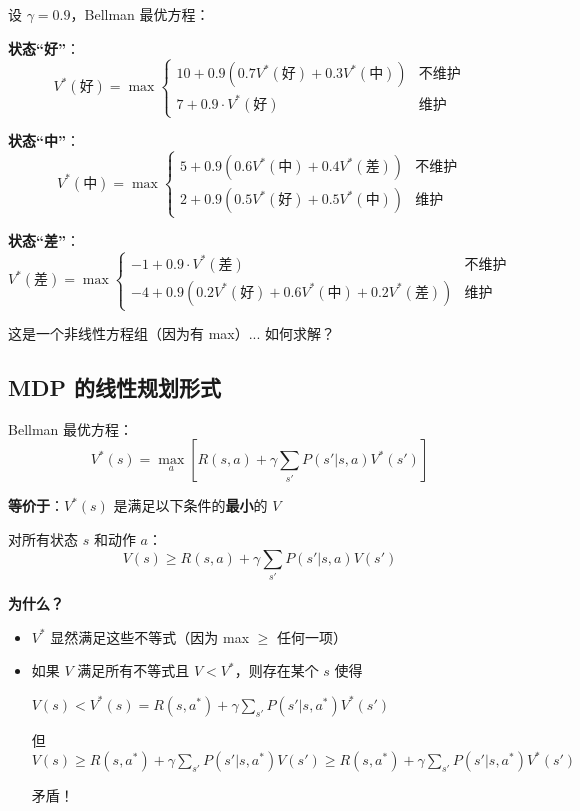\documentclass[12pt, a4paper]{ctexart}
\begin{document}
\begin{blackboard}

设 $\gamma = 0.9$，Bellman 最优方程：

\textbf{状态``好''}：
\[
V^*(\text{好}) = \max \begin{cases}
10 + 0.9 (0.7 V^*(\text{好}) + 0.3 V^*(\text{中})) & \text{不维护} \\
7 + 0.9 \cdot V^*(\text{好}) & \text{维护}
\end{cases}
\]

\textbf{状态``中''}：
\[
V^*(\text{中}) = \max \begin{cases}
5 + 0.9 (0.6 V^*(\text{中}) + 0.4 V^*(\text{差})) & \text{不维护} \\
2 + 0.9 (0.5 V^*(\text{好}) + 0.5 V^*(\text{中})) & \text{维护}
\end{cases}
\]

\textbf{状态``差''}：
\[
V^*(\text{差}) = \max \begin{cases}
-1 + 0.9 \cdot V^*(\text{差}) & \text{不维护} \\
-4 + 0.9 (0.2 V^*(\text{好}) + 0.6 V^*(\text{中}) + 0.2 V^*(\text{差})) & \text{维护}
\end{cases}
\]

这是一个非线性方程组（因为有 max）... 如何求解？

\end{blackboard}

\subsection{MDP 的线性规划形式}

\begin{blackboard}

Bellman 最优方程：
\[
V^*(s) = \max_a \left[ R(s, a) + \gamma \sum_{s'} P(s'|s,a) V^*(s') \right]
\]

\textbf{等价于}：$V^*(s)$ 是满足以下条件的\textbf{最小}的 $V$

对所有状态 $s$ 和动作 $a$：
\[
V(s) \geq R(s, a) + \gamma \sum_{s'} P(s'|s,a) V(s')
\]

\textbf{为什么？}
\begin{itemize}
    \item $V^*$ 显然满足这些不等式（因为 max $\geq$ 任何一项）
    \item 如果 $V$ 满足所有不等式且 $V < V^*$，则存在某个 $s$ 使得
    
    $V(s) < V^*(s) = R(s, a^*) + \gamma \sum_{s'} P(s'|s,a^*) V^*(s')$
    
    但 $V(s) \geq R(s, a^*) + \gamma \sum_{s'} P(s'|s,a^*) V(s') \geq R(s, a^*) + \gamma \sum_{s'} P(s'|s,a^*) V^*(s')$
    
    矛盾！
\end{itemize}

\end{blackboard}
\end{document}
